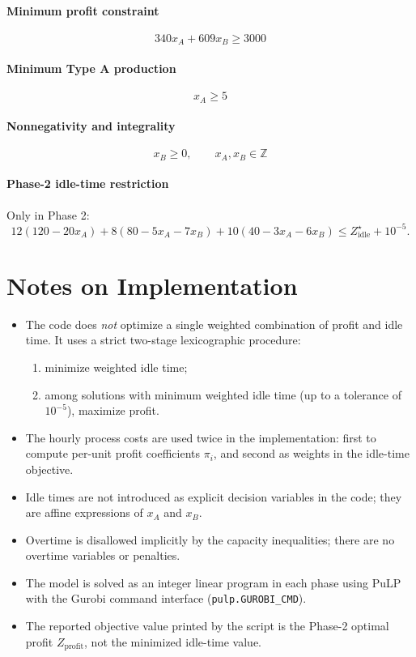 \paragraph{Minimum profit constraint}
\[
340x_A+609x_B \ge 3000
\]

\paragraph{Minimum Type A production}
\[
x_A \ge 5
\]

\paragraph{Nonnegativity and integrality}
\[
x_B \ge 0,\qquad x_A,x_B \in \mathbb{Z}
\]

\paragraph{Phase-2 idle-time restriction}
Only in Phase 2:
\[
12(120-20x_A)+8(80-5x_A-7x_B)+10(40-3x_A-6x_B)\le Z_{\mathrm{idle}}^\star+10^{-5}.
\]

\section*{Notes on Implementation}

\begin{itemize}
    \item The code does \emph{not} optimize a single weighted combination of profit and idle time. It uses a strict two-stage lexicographic procedure:
    \begin{enumerate}
        \item minimize weighted idle time;
        \item among solutions with minimum weighted idle time (up to a tolerance of \(10^{-5}\)), maximize profit.
    \end{enumerate}
    \item The hourly process costs are used twice in the implementation: first to compute per-unit profit coefficients \(\pi_i\), and second as weights in the idle-time objective.
    \item Idle times are not introduced as explicit decision variables in the code; they are affine expressions of \(x_A\) and \(x_B\).
    \item Overtime is disallowed implicitly by the capacity inequalities; there are no overtime variables or penalties.
    \item The model is solved as an integer linear program in each phase using PuLP with the Gurobi command interface (\texttt{pulp.GUROBI\_CMD}).
    \item The reported objective value printed by the script is the Phase-2 optimal profit \(Z_{\mathrm{profit}}\), not the minimized idle-time value.
\end{itemize}
